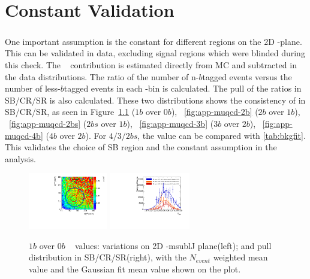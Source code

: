\chapter{Constant \muqcd Validation}
\label{AppendixMuqcd}

\paragraph{}
One important assumption is the constant \muqcd for different regions on the 2D \mleadJ-\msublJ plane. 
This can be validated in data, excluding signal regions which were blinded during this check. 
The \ttbar~ contribution is estimated directly from MC and subtracted in the data distributions. 
The ratio of the number of n-$b$tagged events versus the number of less-$b$tagged events in each \mleadJ-\msublJ bin is calculated.
The pull of the ratios in SB/CR/SR is also calculated.
These two distributions shows the consistency of \muqcd in SB/CR/SR, as seen in Figure~\ref{fig:app-muqcd-1b} ($1b$ over $0b$), ~\ref{fig:app-muqcd-2b} ($2b$ over $1b$), ~\ref{fig:app-muqcd-2bs} ($2bs$ over $1b$), ~\ref{fig:app-muqcd-3b} ($3b$ over $2b$), ~\ref{fig:app-muqcd-4b} ($4b$ over $2b$). For $4/3/2bs$, the \muqcd value can be compared with \ref{tab:bkgfit}. 
This validates the choice of SB region and the constant \muqcd assumption in the analysis.

\begin{figure}[htbp!]
\begin{center}
\includegraphics[width=0.31\textwidth,angle=-90]{figures/boosted/AppendixMuqcdstudy/OneTag_Incl_mH0H1.pdf}
\includegraphics[width=0.31\textwidth,angle=-90]{figures/boosted/AppendixMuqcdstudy/OneTag_Incl_mH0H1_pull.pdf}
\caption{$1b$ over 0$b$ \muqcd~ values: \muqcd variations on 2D \mleadJ-msublJ plane(left); and \muqcd pull distribution in SB/CR/SR(right), with the $N_{event}$ weighted mean value and the Gaussian fit mean value shown on the plot.}
\label{fig:app-muqcd-1b}
\end{center}
\end{figure}

